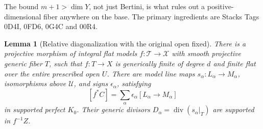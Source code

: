 \documentclass[11pt,a4paper]{article}
\newtheorem{lemma}[theorem]{Lemma}
\theoremstyle{definition}
\theoremstyle{remark}
\begin{document}
The bound $m+1>\dim Y$, not just Bertini, is what rules out a
positive-dimensional fiber anywhere on the base.  The primary
ingredients are Stacks Tags 0D4I, 0FD6, 0G4C and 00R4.

\begin{lemma}[Relative diagonalization with the original open fixed]
\label{r11p:relative-lines}
There is a projective morphism of integral flat models
$f:\mathcal T\to\mathcal X$ with smooth projective generic fiber $T$,
such that $f:T\to X$ is generically finite of degree $d$ and finite
flat over the \emph{entire} prescribed open $U$.  There are model
line maps $s_\alpha:L_\alpha\to M_\alpha$, isomorphisms above
$\mathcal U$, and signs $\epsilon_\alpha$, satisfying
\[
                 [f^*C]
                   =\sum_\alpha\epsilon_\alpha[L_\alpha\to M_\alpha]
\tag{PC2}\label{r11p:supported-k-equality}
\]
in supported perfect $K_0$.  Their generic divisors
$D_\alpha=\operatorname{div}(s_\alpha|_T)$ are supported in $f^{-1}Z$.
\end{lemma}
\end{document}
